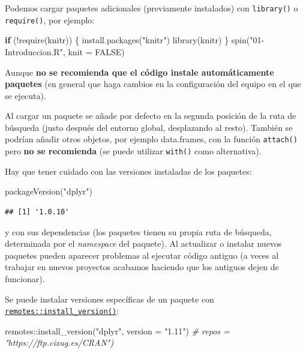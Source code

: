 \documentclass[
]{book}
\newenvironment{Shaded}{\begin{snugshade}}{\end{snugshade}}
\newcommand{\AttributeTok}[1]{\textcolor[rgb]{0.77,0.63,0.00}{#1}}
\newcommand{\CommentTok}[1]{\textcolor[rgb]{0.56,0.35,0.01}{\textit{#1}}}
\newcommand{\ConstantTok}[1]{\textcolor[rgb]{0.00,0.00,0.00}{#1}}
\newcommand{\ControlFlowTok}[1]{\textcolor[rgb]{0.13,0.29,0.53}{\textbf{#1}}}
\newcommand{\FunctionTok}[1]{\textcolor[rgb]{0.00,0.00,0.00}{#1}}
\newcommand{\NormalTok}[1]{#1}
\newcommand{\SpecialCharTok}[1]{\textcolor[rgb]{0.00,0.00,0.00}{#1}}
\newcommand{\StringTok}[1]{\textcolor[rgb]{0.31,0.60,0.02}{#1}}
\theoremstyle{break}
\theoremstyle{nonumberplain}
\begin{document}
Podemos cargar paquetes adicionales (previamente instalados) con \texttt{library()} o \texttt{require()}, por ejemplo:

\begin{Shaded}
\begin{Highlighting}[]
\ControlFlowTok{if}\NormalTok{ (}\SpecialCharTok{!}\FunctionTok{require}\NormalTok{(knitr)) \{}
  \FunctionTok{install.packages}\NormalTok{(}\StringTok{"knitr"}\NormalTok{)}
  \FunctionTok{library}\NormalTok{(knitr)}
\NormalTok{\}}
\FunctionTok{spin}\NormalTok{(}\StringTok{"01{-}Introduccion.R"}\NormalTok{, }\AttributeTok{knit =} \ConstantTok{FALSE}\NormalTok{)}
\end{Highlighting}
\end{Shaded}

Aunque \textbf{no se recomienda que el código instale automáticamente paquetes} (en general que haga cambios en la configuración del equipo en el que se ejecuta).

Al cargar un paquete se añade por defecto en la segunda posición de la ruta de búsqueda (justo después del entorno global, desplazando al resto).
También se podrían añadir otros objetos, por ejemplo data.frames, con la función \texttt{attach()} pero \textbf{no se recomienda} (se puede utilizar \texttt{with()} como alternativa).

Hay que tener cuidado con las versiones instaladas de los paquetes:

\begin{Shaded}
\begin{Highlighting}[]
\FunctionTok{packageVersion}\NormalTok{(}\StringTok{"dplyr"}\NormalTok{)}
\end{Highlighting}
\end{Shaded}

\begin{verbatim}
## [1] '1.0.10'
\end{verbatim}

y con sus dependencias (los paquetes tienen su propia ruta de búsqueda, determinada por el \emph{namespace} del paquete).
Al actualizar o instalar nuevos paquetes pueden aparecer problemas al ejecutar código antiguo (a veces al trabajar en nuevos proyectos acabamos haciendo que los antiguos dejen de funcionar).

Se puede instalar versiones específicas de un paquete con \href{https://remotes.r-lib.org/reference/install_version.html}{\texttt{remotes::install\_version()}}:

\begin{Shaded}
\begin{Highlighting}[]
\NormalTok{remotes}\SpecialCharTok{::}\FunctionTok{install\_version}\NormalTok{(}\StringTok{"dplyr"}\NormalTok{, }\AttributeTok{version =} \StringTok{"1.11"}\NormalTok{) }\CommentTok{\# repos = "https://ftp.cixug.es/CRAN")}
\end{Highlighting}
\end{Shaded}
\end{document}
